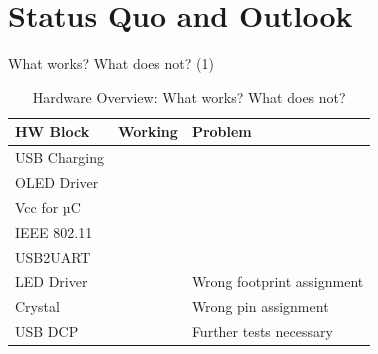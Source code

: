 \documentclass[apectratio=169]{beamer}
\begin{document}
  \section{Status Quo and Outlook}
  	\begin{frame}{What works? What does not? (1)}
	\footnotesize
	\begin{table}[H]
	\centering
	\begin{tabular}{lll}
	\textbf{HW Block}       & \textbf{Working}& \textbf{Problem}    \\\hline
	USB Charging    & \checkmark    &                               \\
	OLED Driver     & \checkmark    &                               \\
	Vcc for µC      & \checkmark    &                               \\
	IEEE 802.11     & \checkmark    &                               \\
	USB2UART        & \checkmark    &                               \\
	LED Driver      &               & Wrong footprint assignment    \\
	Crystal         &               & Wrong pin assignment          \\
	USB DCP         &               & Further tests necessary       \\
	\end{tabular}
	\caption{Hardware Overview: What works? What does not?}
	\label{tab:hw}
	\end{table}
  	\end{frame}
\end{document}
